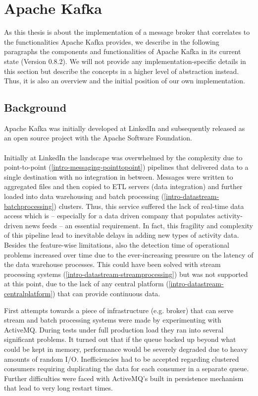 \chapter{Apache Kafka}
\label{intro-kafka}

As this thesis is about the implementation of a message broker that correlates
to the functionalities Apache Kafka provides, we describe in the following paragraphs the
components and functionalities of Apache Kafka in its current state (Version
0.8.2). We will not provide any implementation-specific details in 
this section but describe the concepts in a higher level of
abstraction instead. Thus, it is also an overview and the initial position of our
own implementation. 

\section{Background}

Apache Kafka was initially developed at LinkedIn\cite{linkedin} and subsequently
released as an open source project with the Apache Software
Foundation\cite{apachefoundation}. 
\\ \\
Initially at LinkedIn the landscape was overwhelmed by the complexity due to
point-to-point (\ref{intro-messaging-pointtopoint})
pipelines that delivered data to a single destination with no
integration in between. Messages were written to aggregated files and then copied
to ETL servers (data integration) and further loaded into data warehousing and batch
processing (\ref{intro-datastream-batchprocessing})
clusters. Thus, this service suffered the lack of real-time data access which
is -- especially for a data driven company that populates activity-driven news
feeds -- an essential requirement. In fact, this fragility and complexity of this
pipeline lead to inevitable delays in adding new types of activity data.
Besides the feature-wise limitations, also the detection time of operational
problems increased over time due to the ever-increasing pressure on the latency
of the data warehouse processes. This could have been solved with
stream processing systems (\ref{intro-datastream-streamprocessing}) but was not
supported at this point, due to the lack of any central platform
(\ref{intro-datastream-centralplatform}) that can provide continuous data.
\cite{goodhope2012building}

First attempts towards a piece of infrastructure (e.g. broker) that can serve
stream and batch processing systems were made by experimenting with
ActiveMQ\cite{activemq}. During tests under full production load they ran into
several significant problems. It turned out that if the queue backed up beyond what could
be kept in memory, performance would be severely degraded due to heavy amounts of
random I/O. Inefficiencies had to be accepted regarding clustered consumers
requiring duplicating the data for each consumer in a separate queue. Further
difficulties were faced with ActiveMQ's built in persistence mechanism that lead
to very long restart times. 

